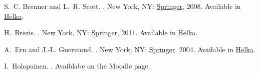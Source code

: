 \documentclass[12pt,oneside]{amsart}
\begin{document}
\begin{thebibliography}{1}

S.~C. {Brenner} and L.~R. {Scott}.
.
\newblock New York, NY: \href{https://doi.org/10.1007/978-0-387-75934-0}{Springer}, 2008.
Available in \href{https://helka.helsinki.fi/permalink/358UOH_INST/q5v72t/alma9934193675806253}{Helka}.

H.~{Brezis}.
.
\newblock New York, NY: \href{https://doi.org/10.1007/978-0-387-70914-7}{Springer}, 2011.
Available in \href{https://helka.helsinki.fi/permalink/358UOH_INST/1rnip4l/alma9926442113506253}{Helka}.

A.~{Ern} and J.-L. {Guermond}.
.
\newblock New York, NY: \href{https://doi.org/10.1007/978-1-4757-4355-5}{Springer}, 2004.
Available in \href{https://helka.helsinki.fi/permalink/358UOH_INST/1rnip4l/alma9934192676606253}{Helka}.

I.~{Holopainen}.
.
\newblock Avaiblabe on the Moodle page.

\end{thebibliography}
\end{document}
